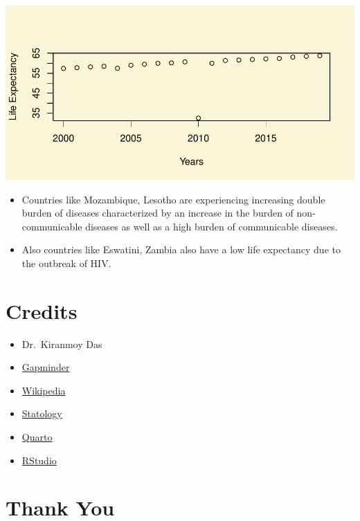 \documentclass[
]{article}
\providecommand{\tightlist}{%
  \setlength{\itemsep}{0pt}\setlength{\parskip}{0pt}}\usepackage{longtable,booktabs,array}
\begin{document}
\includegraphics{main_files/figure-pdf/unnamed-chunk-33-1.pdf}

\begin{itemize}
\tightlist
\item
  Countries like Mozambique, Lesotho are experiencing increasing double
  burden of diseases characterized by an increase in the burden of
  non-communicable diseases as well as a high burden of communicable
  diseases.
\item
  Also countries like Eswatini, Zambia also have a low life expectancy
  due to the outbreak of HIV.
\end{itemize}

\hypertarget{credits}{%
\section{Credits}\label{credits}}

\begin{itemize}
\tightlist
\item
  Dr.~Kiranmoy Das
\item
  \href{https://gapminder.org}{Gapminder}
\item
  \href{https://wikipedia.org}{Wikipedia}
\item
  \href{https://statology.org}{Statology}
\item
  \href{https://quarto.org}{Quarto}
\item
  \href{https://posit.co/products/open-source/rstudio/}{RStudio}
\end{itemize}

\hypertarget{thank-you}{%
\section{Thank You}\label{thank-you}}
\end{document}
